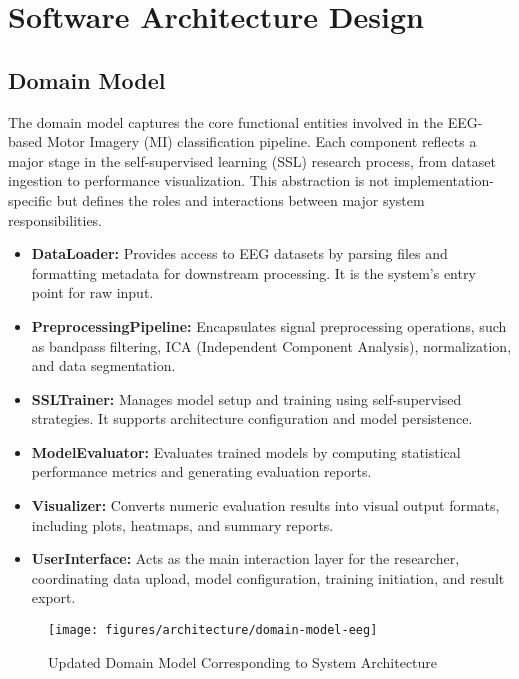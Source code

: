 \chapter{Software Architecture Design}
\label{ch:software-architecture-design}

\section{Domain Model}
\label{sec:domain-model}

The domain model captures the core functional entities involved in the EEG-based Motor Imagery (MI) classification pipeline. Each component reflects a major stage in the self-supervised learning (SSL) research process, from dataset ingestion to performance visualization. This abstraction is not implementation-specific but defines the roles and interactions between major system responsibilities.

\begin{itemize}
    \item \textbf{DataLoader:} Provides access to EEG datasets by parsing files and formatting metadata for downstream processing. It is the system’s entry point for raw input.
    \item \textbf{PreprocessingPipeline:} Encapsulates signal preprocessing operations, such as bandpass filtering, ICA (Independent Component Analysis), normalization, and data segmentation.
    \item \textbf{SSLTrainer:} Manages model setup and training using self-supervised strategies. It supports architecture configuration and model persistence.
    \item \textbf{ModelEvaluator:} Evaluates trained models by computing statistical performance metrics and generating evaluation reports.
    \item \textbf{Visualizer:} Converts numeric evaluation results into visual output formats, including plots, heatmaps, and summary reports.
    \item \textbf{UserInterface:} Acts as the main interaction layer for the researcher, coordinating data upload, model configuration, training initiation, and result export.
\end{itemize}

\begin{figure}[h!]
    \centering
    \texttt{[image: figures/architecture/domain-model-eeg]}
    \caption{Updated Domain Model Corresponding to System Architecture}
    \label{fig:figure9}
\end{figure}

